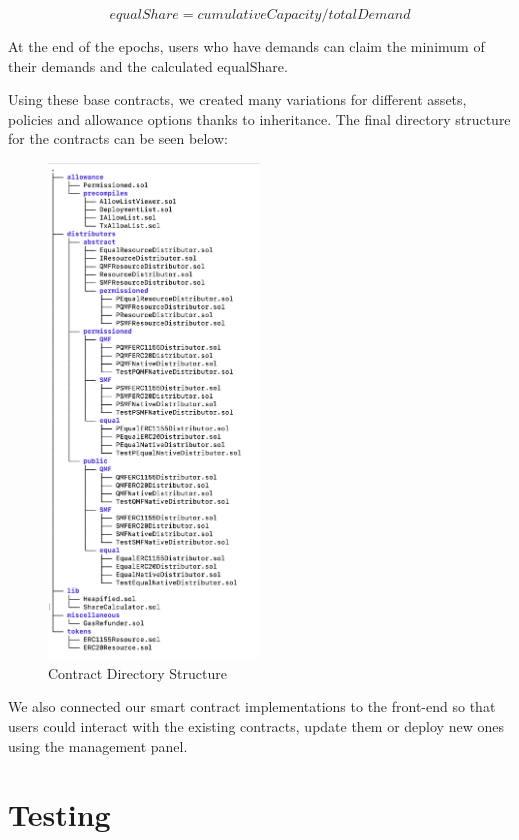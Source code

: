 \documentclass[a4paper,12pt]{report}
\begin{document}
\begin{figure}[H]
	\[
	equalShare = cumulativeCapacity / totalDemand
	\]
\end{figure}

At the end of the epochs, users who have demands can claim the minimum of their demands and the calculated equalShare.

Using these base contracts, we created many variations for different assets, policies and allowance options thanks to inheritance. The final directory structure for the contracts can be seen below:

\begin{figure}[H]
	\centering
	\includegraphics[width=0.5\textwidth]{dir.png}
	\caption{Contract Directory Structure}
\end{figure}

We also connected our smart contract implementations to the front-end so that users could interact with the existing contracts, update them or deploy new ones using the management panel.

\section{Testing}
\end{document}
